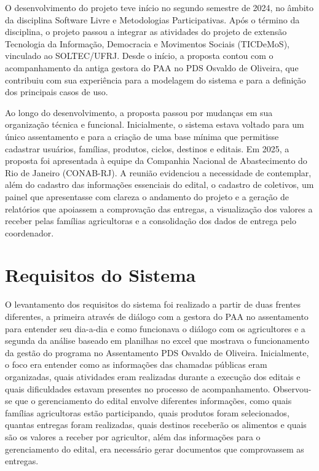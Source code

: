 \documentclass[grad,pdftex]{poli}
\begin{document}
O desenvolvimento do projeto teve início no segundo semestre de 2024, no âmbito da disciplina Software Livre e Metodologias Participativas. Após o término da disciplina, o projeto passou a integrar as atividades do projeto de extensão Tecnologia da Informação, Democracia e Movimentos Sociais (TICDeMoS), vinculado ao SOLTEC/UFRJ. Desde o início, a proposta contou com o acompanhamento da antiga gestora do PAA no PDS Osvaldo de Oliveira, que contribuiu com sua experiência para a modelagem do sistema e para a definição dos principais casos de uso.

Ao longo do desenvolvimento, a proposta passou por mudanças em sua organização técnica e funcional. Inicialmente, o sistema estava voltado para um único assentamento e para a criação de uma base mínima que permitisse cadastrar usuários, famílias, produtos, ciclos, destinos e editais. Em 2025, a proposta foi apresentada à equipe da Companhia Nacional de Abastecimento do Rio de Janeiro (CONAB-RJ). A reunião evidenciou a necessidade de contemplar, além do cadastro das informações essenciais do edital, o cadastro de coletivos, um painel que apresentasse com clareza o andamento do projeto e a geração de relatórios que apoiassem a comprovação das entregas, a visualização dos valores a receber pelas famílias agricultoras e a consolidação dos dados de entrega pelo coordenador.


\section{Requisitos do Sistema}

O levantamento dos requisitos do sistema foi realizado a partir de duas frentes diferentes, a primeira através de diálogo com a gestora do PAA no assentamento para entender seu dia-a-dia e como funcionava o diálogo com os agricultores e a segunda da análise baseado em planilhas no excel que mostrava o funcionamento da gestão do programa no Assentamento PDS Osvaldo de Oliveira. Inicialmente, o foco era entender como as informações das chamadas públicas eram organizadas, quais atividades eram realizadas durante a execução dos editais e quais dificuldades estavam presentes no processo de acompanhamento. Observou-se que o gerenciamento do edital envolve diferentes informações, como quais famílias agricultoras estão participando, quais produtos foram selecionados, quantas entregas foram realizadas, quais destinos receberão os alimentos e quais são os valores a receber por agricultor, além das informações para o gerenciamento do edital, era necessário gerar documentos que comprovassem as entregas.
\end{document}
